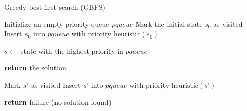 \documentclass[ppgc,diss,english]{iiufrgs}
\begin{document}
\begin{algorithm}
\caption{Greedy best-first search (GBFS)}
\label{alg:gbfs}
\begin{algorithmic}[1]
  \State Initialize an empty priority queue $pqueue$
  \State Mark the initial state $s_0$ as visited
  \State Insert $s_0$ into $pqueue$ with priority $\text{heuristic}(s_0)$

    \State $s \gets$ state with the highest priority in $pqueue$

      \State \textbf{return} the solution
    \EndIf

        \State Mark $s'$ as visited
        \State Insert $s'$ into $pqueue$ with priority $\text{heuristic}(s')$
      \EndIf
    \EndFor
  \EndWhile

  \State \textbf{return} failure (no solution found)
\EndProcedure
\end{algorithmic}
\end{algorithm}
\end{document}
